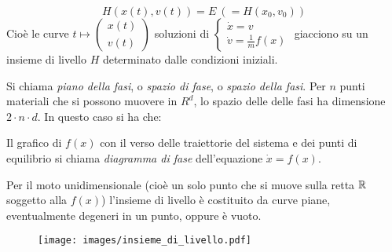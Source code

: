 \documentclass[Main.tex]{subfiles}
\begin{document}
\begin{equation}
  H(x(t),v(t)) = E \ (=H(x_0,v_0))
\end{equation}
Cioè le curve $t \mapsto \left( \begin{array}{c} x(t) \\ v(t)\end{array} \right) $ soluzioni di $\begin{cases} \dot x= v \\ \dot v = \frac{1}{m}f(x)\end{cases}$ giacciono su un insieme di livello $H$ determinato dalle condizioni iniziali.

Si chiama \emph{piano della fasi}, o \emph{ spazio di fase}, o \emph{spazio della fasi}. Per $n$ punti materiali che si possono muovere in $R^d$, lo spazio delle delle fasi ha dimensione $2\cdot n \cdot d$. In questo caso si ha che:
\begin{df}
Il grafico di $f(x)$ con il verso delle traiettorie del sistema e dei punti di equilibrio si chiama \emph{diagramma di fase} dell'equazione $\dot x = f(x)$.
\end{df}



Per il moto unidimensionale (cioè un solo punto che si muove sulla retta $\mathbb{R}$ soggetto alla $f(x)$) l'insieme di livello è costituito da curve piane, eventualmente degeneri in un punto, oppure è vuoto.
\begin{figure}[H]
    \centering
    \texttt{[image: images/insieme\_di\_livello.pdf]}
\end{figure}
\end{document}

